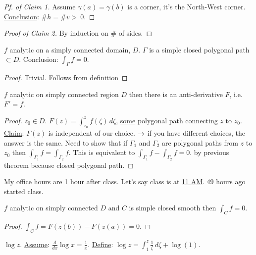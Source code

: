 \documentclass[]{article}
\begin{document}
\begin{proof}
	[Pf. of Claim 1] Assume $\gamma(a) = \gamma(b)$ is a corner, it's the North-West corner. \underline{Conclusion}: $\#h = \#v >~0$.
\end{proof}
\begin{proof}
	[Proof of Claim 2] By induction on \# of sides.
\end{proof}
\begin{theorem}
	$f$ analytic on a simply connected domain, $D$. $\Gamma$ is a simple closed polygonal path $\subset D$. Conclusion: $\int_{\Gamma} f = 0$.
\end{theorem}
\begin{proof}
	Trivial. Follows from definition
\end{proof}
\begin{theorem}
	$f$ analytic on simply connected region $D$ then there is an anti-derivative $F$, i.e. $F' = f$.
\end{theorem}
\begin{proof}
	$z_0\in D$.  $F(z) = \int_{z_0}^z f(\zeta) \, d\zeta$, \underline{some} polygonal path connecting $z$ to $z_0$.
	\underline{Claim}: $F(z)$ is independent of our choice.  $\rightarrow$ if you have different choices, the answer is the same. Need to show that if $\Gamma_1$ and $\Gamma_2$ are polygonal paths from $z$ to $z_0$ then $\int_{\Gamma_1} f = \int_{\Gamma_2} f$. This is equivalent to $\int_{\Gamma_1} f - \int_{\Gamma_2} f = 0$. by previous theorem because  closed polygonal path.
\end{proof}
\begin{example}
	 My office hours are 1 hour after class. Let's say class is at \underline{11 AM}. 49 hours ago started class.
\end{example}
\begin{theorem}
	$f$ analytic on simply connected $D$ and $C$ is simple closed smooth then $\int_C f = 0$.
\end{theorem}
\begin{proof}
	$\int_C f = F(z(b)) - F(z(a)) = 0$.
\end{proof}

$\log{z}$. \underline{Assume}: $\frac{d}{dx} \log{x} = \frac{1}{x}$.
\underline{Define}: $\log{z} = \int_1^z \frac{1}{\zeta} \, d\zeta + \log{(1)}$.
\end{document}
